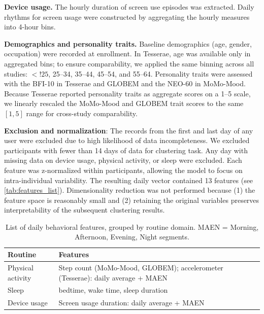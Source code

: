 \documentclass[pdflatex,sn-vancouver,Numbered]{bst/sn-jnl}%
\theoremstyle{thmstyleone}%
\theoremstyle{thmstyletwo}%
\theoremstyle{thmstylethree}%
\begin{document}
\textbf{Device usage.} The hourly duration of screen use episodes was extracted. Daily rhythms for screen usage were constructed by aggregating the hourly measures into 4-hour bins. 

\textbf{Demographics and personality traits.} Baseline demographics (age, gender, occupation) were recorded at enrollment. In Tesserae, age was available only in aggregated bins; to ensure comparability, we applied the same binning across all studies: $<!25$, 25–34, 35–44, 45–54, and 55–64. Personality traits were assessed with the BFI-10 \cite{rammstedt2007measuring} in Tesserae and GLOBEM and the NEO-60 \cite{costa1992neo} in MoMo-Mood. Because Tesserae reported personality traits as aggregate scores on a 1–5 scale, we linearly rescaled the MoMo-Mood and GLOBEM trait scores to the same $[1,5]$ range for cross-study comparability.

\textbf{Exclusion and normalization}: The records from the first and last day of any user were excluded due to high likelihood of data incompleteness. We excluded participants with fewer than 14 days of data for clustering task. Any day with missing data on device usage, physical activity, or sleep were excluded. Each feature was z-normalized within participants, allowing the model to focus on intra-individual variability. The resulting daily vector contained 13 features (see \autoref{tab:features_list}). Dimensionality reduction was not performed because (1) the feature space is reasonably small and (2) retaining the original variables preserves interpretability of the subsequent clustering results.

\begin{table}[ht]
    \centering
    \begin{tabular}{ll}
        \toprule
        \textbf{Routine} & \textbf{Features} \\
        \midrule
        Physical activity & Step count (MoMo-Mood, GLOBEM); accelerometer (Tesserae): daily average + MAEN \\
        Sleep             & bedtime, wake time, sleep duration \\
        Device usage      & Screen usage duration: daily average + MAEN \\
        \bottomrule
    \end{tabular}
    \caption{List of daily behavioral features, grouped by routine domain. MAEN = Morning, Afternoon, Evening, Night segments.}
    \label{tab:features_list}
\end{table}
\end{document}
